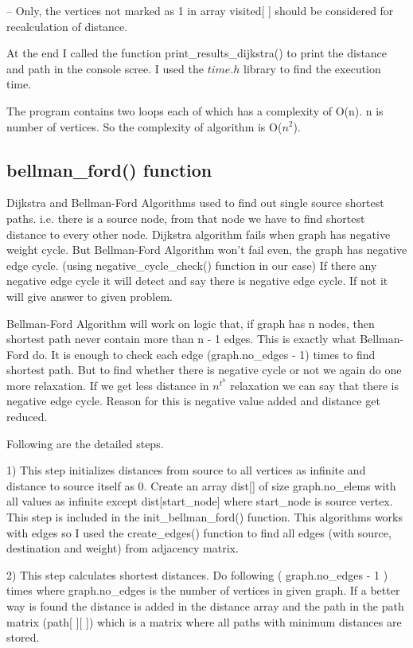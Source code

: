 \documentclass[12]{article}
\begin{document}
– Only, the vertices not marked as 1 in array visited[ ] should be considered for recalculation of distance.
   
   At the end I called the function print\_results\_dijkstra() to print the distance and path in the console scree. I used the $time.h$ library to find the execution time.
   
 
 The program contains two loops each of which has a complexity of O(n). n is number of vertices. So the complexity of algorithm is O($n^2$).

\subsection{bellman\_ford() function}
\textbf{}
Dijkstra and Bellman-Ford Algorithms used to find out single source shortest paths. i.e. there is a source node, from that node we have to find shortest distance to every other node. Dijkstra algorithm fails when graph has negative weight cycle. But Bellman-Ford Algorithm won’t fail even, the graph has negative edge cycle. (using negative\_cycle\_check() function in our case) If there any negative edge cycle it will detect and say there is negative edge cycle. If not it will give answer to given problem.

Bellman-Ford Algorithm will work on logic that, if graph has n nodes, then shortest path never contain more than n - 1 edges. This is exactly what Bellman-Ford do. It is enough to check each edge (graph.no\_edges - 1) times to find shortest path. But to find whether there is negative cycle or not we again do one more relaxation. If we get less distance in $n^t^h$ relaxation we can say that there is negative edge cycle. Reason for this is negative value added and distance get reduced.

Following are the detailed steps.


1) This step initializes distances from source to all vertices as infinite and distance to source itself as 0. Create an array dist[] of size graph.no\_elems with all values as infinite except dist[start\_node] where start\_node is source vertex. This step is included in the init\_bellman\_ford() function. This algorithms works with edges so I used the create\_edges() function to find all edges (with source, destination and weight) from adjacency matrix.

2) This step calculates shortest distances. Do following ( graph.no\_edges - 1 ) times where graph.no\_edges is the number of vertices in given graph. If a better way is found the distance is added in the distance array and the path in the path matrix (path[ ][ ]) which is a matrix where all paths with minimum distances are stored.
\end{document}

